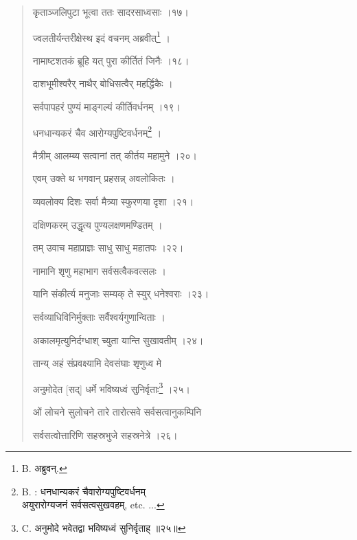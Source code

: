 \documentclass[a4paper, 11pt, oneside, french, landscape, twocolumn]{article}
\begin{document}
\begin{quotation}
\texthindi{कृताञ्जलिपुटा भूत्वा ततः सादरसाध्वसाः ।१७।}

\bigskip

\texthindi{ज्वलतीर्यन्तरीक्षेस्थ इदं वचनम् अब्रवीत्\footnote{B. \texthindi{अब्रुवन्}.} ।}

\texthindi{नामाष्टशतकं ब्रूहि यत् पुरा कीर्तितं जिनैः ।१८।}

\bigskip

\texthindi{दाशभूमीश्वरैर् नाथैर् बोधिसत्वैर् महर्द्धिकैः ।}

\texthindi{सर्वपापहरं पुण्यं माङ्गल्यं कीर्तिवर्धनम् ।१९।}

\bigskip

\texthindi{धनधान्यकरं चैव आरोग्यपुष्टिवर्धनम्\footnote{B. : \texthindi{धनधान्यकरं चैवारोग्यपुष्टिवर्धनम्}\\\hspace*{10mm}\texthindi{अयुरारोग्यजनं सर्वसत्वसुखवहम्}, etc. ...} ।}

\texthindi{मैत्रीम् आलम्ब्य सत्वानां तत् कीर्तय महामुने ।२०।}

\bigskip

\texthindi{एवम् उक्ते थ भगवान् प्रहसन्न् अवलोकितः ।}

\texthindi{व्यवलोक्य दिशः सर्वा मैत्र्या स्फुरणया दृशा ।२१।}

\bigskip

\texthindi{दक्षिणकरम् उद्धृत्य पुण्यलक्षणमण्डितम् ।}

\texthindi{तम् उवाच महाप्राज्ञः साधु साधु महातपः ।२२।}

\bigskip

\texthindi{नामानि शृणु महाभाग सर्वसत्वैकवत्सलः ।}

\texthindi{यानि संकीर्त्य मनुजाः सम्यक् ते स्युर् धनेश्वराः ।२३।}

\bigskip

\texthindi{सर्वव्याधिविनिर्मुक्ताः सर्वैश्वर्यगुणान्विताः ।}

\texthindi{अकालमृत्युनिर्दग्धाश् च्युता यान्ति सुखावतीम् ।२४।}

\bigskip

\texthindi{तान्य् अहं संप्रवक्ष्यामि देवसंघाः शृणुध्व मे}

\texthindi{अनुमोदेत [सद्] धर्मे भविष्यध्वं सुनिर्वृताः\footnote{C. \texthindi{अनुमोदे भवेतद्वा भविष्यध्वं सुनिर्वृताह् ॥२५॥}} ।२५।}

\bigskip

\texthindi{ओं लोचने सुलोचने तारे तारोत्सवे सर्वसत्वानुकम्पिनि}

\texthindi{सर्वसत्वोत्तारिणि सहस्रभुजे सहस्रनेत्रे ।२६।}


\end{quotation}
\end{document}
